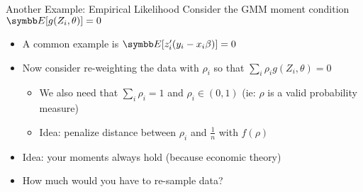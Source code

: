 \documentclass[aspectratio=169,11pt]{beamer}
\begin{document}

\begin{frame}{Another Example: Empirical Likelihood}
Consider the GMM moment condition $\E[g(Z_i,\theta)]=0$
\begin{itemize}
\item A common example is $\E[z_i' (y_i-x_i \beta)]=0$
\item Now consider re-weighting the data with $\rho_i$ so that $\sum_i \rho_i g(Z_i,\theta)=0$
\begin{itemize}
\item We also need that $\sum_i \rho_i =1$ and $\rho_i \in (0,1)$ (ie: $\rho$ is a valid probability measure)
\item Idea: penalize distance between $\rho_i$ and $\frac{1}{n}$ with $f(\rho)$
\end{itemize}
\item Idea: your moments always hold (because economic theory)
\item How much would you have to re-sample data?
\end{itemize}
\end{frame}
\end{document}
